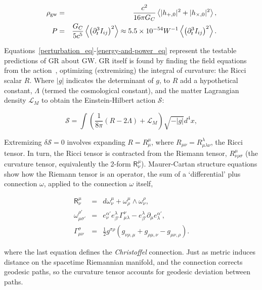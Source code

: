 \begin{eqnarray}
\rho_{\textup{gw}} &=& \frac{c^2}{16 \pi G_C} \left\langle |h_{+,0}|^2 + |h_{\times,0}|^2 \right\rangle,\\
P &=& \frac{G_C}{5c^5}\left\langle \left( \partial_t^3 I_{ij}\right)^2  \right\rangle \approx 5.5\times 10^{-54} W^{-1} \left\langle \left( \partial_t^3 I_{ij}\right)^2  \right\rangle.
\label{energy-and-power_eq}
\end{eqnarray}

Equations~\ref{perturbation_eq}-\ref{energy-and-power_eq} represent the testable predictions of GR about GW. 
GR itself is found by finding the field equations from the action~\cite{FarrThesis}, optimizing (extremizing) the integral of curvature: the Ricci scalar $R$.
Where $|g|$ indicates the determinant of $g$, to $R$ add a hypothetical constant, $\Lambda$ (termed the cosmological constant), and the matter Lagrangian density $\mathcal{L}_M$ to obtain the Einstein-Hilbert action $\mathcal{S}$:

\begin{equation}
\mathcal{S} = \int \left( \frac{1}{8\pi}\left(R - 2\Lambda\right) + \mathcal{L}_M \right) \sqrt{-|g|}d^4 x,
\end{equation}

Extremizing $\delta \mathcal{S} = 0$ involves expanding $R = R^\mu_\mu$, where $R_{\mu\nu} = R^\lambda_{\mu\lambda\nu}$, the Ricci tensor. In turn, the Ricci tensor is contracted from the Riemann tensor, $R^\mu_{\nu\rho\sigma}$ (the curvature tensor, equivalently the 2-form $\textsf{R}^\mu_\nu$). Maurer-Cartan structure equations show how the Riemann tensor is an operator, the sum of a `differential' plus connection $\omega$, applied to the connection $\omega$ itself,

\begin{eqnarray}
\textsf{R}^\mu_\nu &=& d\omega^\mu_\nu + \omega^\mu_\rho \wedge \omega^\rho_\nu, \\
\omega^{\rho'}_{\mu\sigma'} &=& e^{\alpha'}_{\nu} e^{\lambda}_{\beta'} \Gamma^{\nu}_{\mu\lambda} - e^{\lambda}_{\beta'} \partial_{\mu} e^{\alpha'}_{\lambda},\\
\Gamma^\sigma_{\mu\nu} &=& \frac{1}{2} g^{\sigma\rho} \left( g_{\nu \rho, \mu} + g_{\rho \mu, \nu} - g_{\mu\nu,\rho} \right). 
\end{eqnarray}

\noindent where the last equation defines the \textit{Christoffel} connection. Just as metric induces distance on the spacetime Riemannian manifold, and the connection corrects geodesic paths, so the curvature tensor accounts for geodesic deviation between paths.

